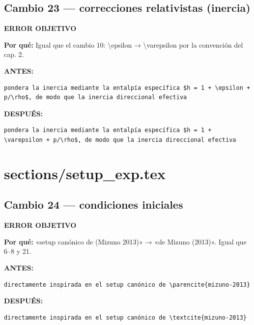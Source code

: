 \documentclass[11pt,a4paper]{article}
\begin{document}
\subsection*{Cambio 23 --- correcciones relativistas (inercia)}
\colorbox{okbg}{\textbf{\footnotesize ERROR OBJETIVO}}

\textbf{Por qué:} Igual que el cambio 10: \textbackslash{}epsilon → \textbackslash{}varepsilon por la convención del cap. 2.

\textcolor{antesline}{\textbf{ANTES:}}
\begin{Verbatim}[breaklines=true, breakanywhere=true, fontsize=\small, frame=leftline, rulecolor=\color{antesline}, framerule=1.2pt]
pondera la inercia mediante la entalpía específica $h = 1 + \epsilon + p/\rho$, de modo que la inercia direccional efectiva
\end{Verbatim}
\textcolor{despline}{\textbf{DESPUÉS:}}
\begin{Verbatim}[breaklines=true, breakanywhere=true, fontsize=\small, frame=leftline, rulecolor=\color{despline}, framerule=1.2pt]
pondera la inercia mediante la entalpía específica $h = 1 + \varepsilon + p/\rho$, de modo que la inercia direccional efectiva
\end{Verbatim}


\section*{sections/setup\_exp.tex}
\subsection*{Cambio 24 --- condiciones iniciales}
\colorbox{okbg}{\textbf{\footnotesize ERROR OBJETIVO}}

\textbf{Por qué:} «setup canónico de (Mizuno 2013)» → «de Mizuno (2013)». Igual que 6--8 y 21.

\textcolor{antesline}{\textbf{ANTES:}}
\begin{Verbatim}[breaklines=true, breakanywhere=true, fontsize=\small, frame=leftline, rulecolor=\color{antesline}, framerule=1.2pt]
directamente inspirada en el setup canónico de \parencite{mizuno-2013}
\end{Verbatim}
\textcolor{despline}{\textbf{DESPUÉS:}}
\begin{Verbatim}[breaklines=true, breakanywhere=true, fontsize=\small, frame=leftline, rulecolor=\color{despline}, framerule=1.2pt]
directamente inspirada en el setup canónico de \textcite{mizuno-2013}
\end{Verbatim}
\end{document}
